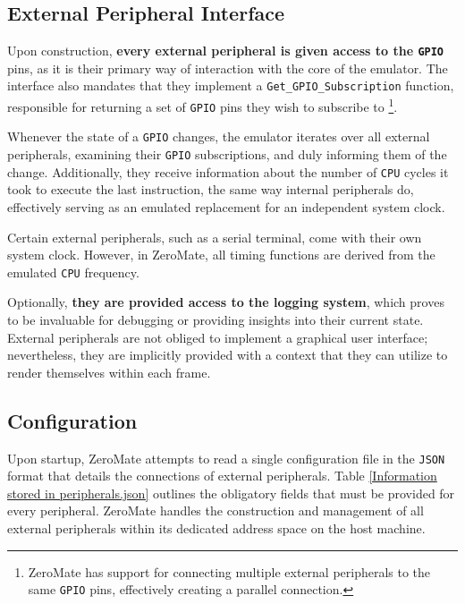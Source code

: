 \documentclass[english, ing, kiv, he, iso690numb, pdf]{fasthesis}
\begin{document}
	\subsection{External Peripheral Interface}
	
	Upon construction, \textbf{every external peripheral is given access to the \texttt{GPIO}} pins, as it is their primary way of interaction with the core of the emulator. The interface also mandates that they implement a \texttt{Get\_GPIO\_Subscription} function, responsible for  returning a set of \texttt{GPIO} pins they wish to subscribe to \footnote{ZeroMate has support for connecting multiple external peripherals to the same \texttt{GPIO} pins, effectively creating a parallel connection.}. 
	
	Whenever the state of a \texttt{GPIO} changes, the emulator iterates over all external peripherals, examining their \texttt{GPIO} subscriptions, and duly informing them of the change. Additionally, they receive information about the number of \texttt{CPU} cycles it took to execute the last instruction, the same way internal peripherals do, effectively serving as an emulated replacement for an independent system clock.
	
	\begin{important}
		Certain external peripherals, such as a serial terminal, come with their own system clock. However, in ZeroMate, all timing functions are derived from the emulated \texttt{CPU} frequency.
	\end{important}
	
	Optionally, \textbf{they are provided access to the logging system}, which proves to be invaluable for debugging or providing insights into their current state. External peripherals are not obliged to implement a graphical user interface; nevertheless, they are implicitly provided with a context that they can utilize to render themselves within each frame.
	
	\subsection{Configuration}
	
	Upon startup, ZeroMate attempts to read a single configuration file in the \texttt{JSON} format that details the connections of external peripherals. Table \ref{Information stored in peripherals.json} outlines the obligatory fields that must be provided for every peripheral. ZeroMate handles the construction and management of all external peripherals within its dedicated address space on the host machine.
	
\end{document}

